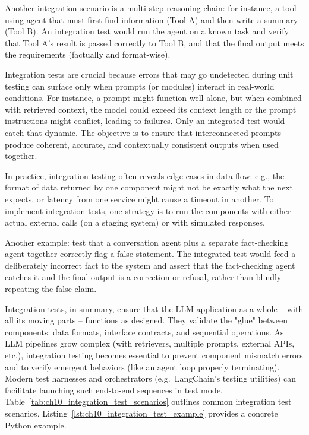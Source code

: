 Another integration scenario is a multi-step reasoning chain: for instance, a tool-using agent that must first find information (Tool A) and then write a summary (Tool B). An integration test would run the agent on a known task and verify that Tool A’s result is passed correctly to Tool B, and that the final output meets the requirements (factually and format-wise).  

Integration tests are crucial because errors that may go undetected during unit testing can surface only when prompts (or modules) interact in real-world conditions. For instance, a prompt might function well alone, but when combined with retrieved context, the model could exceed its context length or the prompt instructions might conflict, leading to failures. Only an integrated test would catch that dynamic. The objective is to ensure that interconnected prompts produce coherent, accurate, and contextually consistent outputs when used together.

In practice, integration testing often reveals edge cases in data flow: e.g., the format of data returned by one component might not be exactly what the next expects, or latency from one service might cause a timeout in another. To implement integration tests, one strategy is to run the components with either actual external calls (on a staging system) or with simulated responses.  

Another example: test that a conversation agent plus a separate fact-checking agent together correctly flag a false statement. The integrated test would feed a deliberately incorrect fact to the system and assert that the fact-checking agent catches it and the final output is a correction or refusal, rather than blindly repeating the false claim.  

Integration tests, in summary, ensure that the LLM application as a whole – with all its moving parts – functions as designed. They validate the "glue" between components: data formats, interface contracts, and sequential operations. As LLM pipelines grow complex (with retrievers, multiple prompts, external APIs, etc.), integration testing becomes essential to prevent component mismatch errors and to verify emergent behaviors (like an agent loop properly terminating). Modern test harnesses and orchestrators (e.g.\ LangChain's testing utilities) can facilitate launching such end-to-end sequences in test mode.
Table~\ref{tab:ch10_integration_test_scenarios} outlines common integration test scenarios. Listing~\ref{lst:ch10_integration_test_example} provides a concrete Python example.

